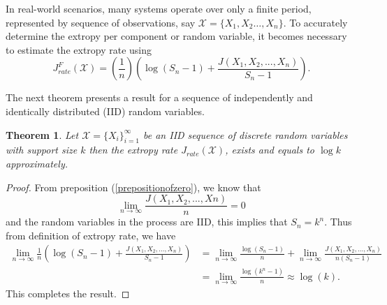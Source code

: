 \documentclass[pdflatex]{sn-jnl}%
\theoremstyle{thmstyleone}
\newtheorem{theorem}{Theorem}
\theoremstyle{thmstyletwo}%
\theoremstyle{thmstylethree}%
\begin{document}
In real-world scenarios, many systems operate over only a finite period, represented by sequence of observations, say $\mathcal{X}=\{X_1,X_2 \ldots, X_n\}$. To accurately determine the extropy per component or random variable, it becomes necessary to estimate the extropy rate using 
\begin{equation}
    J_{rate}^{F}(\mathcal{X})=\left(\frac{1}{n} \right) \left(\log\left(S_n-1 \right)+\frac{J(X_1,X_2,...,X_n)}{S_n-1} \right).
\end{equation}

The next theorem presents a result for a sequence of independently and identically distributed (IID) random variables.
\begin{theorem}
Let \(\mathcal{X}= \{X_i\}_{i=1}^\infty \) be an IID sequence of discrete random variables with support size \( k \) then the extropy rate $J_{rate}(\mathcal{X})$, exists and equals to \( \log k \) approximately.
\end{theorem}
\begin{proof}
    From preposition (\ref{prepositionofzero}), we know that 
    \begin{equation*}
        \lim_{n\to \infty}\frac{J(X_1,X_2,...,Xn)}{n}=0
    \end{equation*}
    and the random variables in the process are IID, this implies that $S_n=k^n$. Thus from definition of extropy rate, we have
    \begin{equation}
    \begin{split}
        \lim_{n\to \infty}\frac{1}{n} \left(\log({S_n}-1)+\frac{J(X_1, X_2,...,X_n)}{{S_n}-1}\right)&=\lim_{n\to \infty}\frac{\log({S_n}-1)}{n}+\lim_{n\to \infty}\frac{J(X_1, X_2,...,X_n)}{n({S_n}-1)} \\
        &= \lim_{n\to \infty}\frac{\log({k^n}-1)}{n}\approx \log(k).
    \end{split}
    \end{equation}
    This completes the result.
\end{proof}
\end{document}
